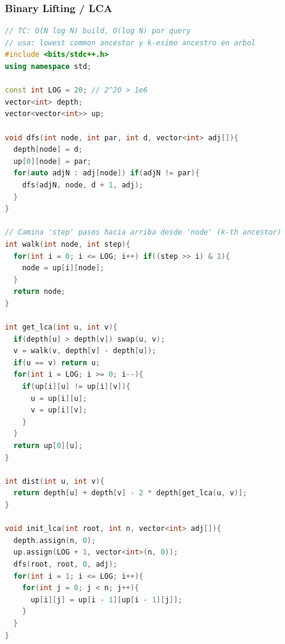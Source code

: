 \subsubsection{Binary Lifting / LCA}
\begin{lstlisting}[style=mystyle, language=C++]
// TC: O(N log N) build, O(log N) por query
// usa: lowest common ancestor y k-esimo ancestro en arbol
#include <bits/stdc++.h>
using namespace std;

const int LOG = 20; // 2^20 > 1e6
vector<int> depth;
vector<vector<int>> up;

void dfs(int node, int par, int d, vector<int> adj[]){
  depth[node] = d;
  up[0][node] = par;
  for(auto adjN : adj[node]) if(adjN != par){
    dfs(adjN, node, d + 1, adj);
  }
}

// Camina 'step' pasos hacia arriba desde 'node' (k-th ancestor)
int walk(int node, int step){
  for(int i = 0; i <= LOG; i++) if((step >> i) & 1){
    node = up[i][node];
  }
  return node;
}

int get_lca(int u, int v){
  if(depth[u] > depth[v]) swap(u, v);
  v = walk(v, depth[v] - depth[u]);
  if(u == v) return u;
  for(int i = LOG; i >= 0; i--){
    if(up[i][u] != up[i][v]){
      u = up[i][u];
      v = up[i][v];
    }
  }
  return up[0][u];
}

int dist(int u, int v){
  return depth[u] + depth[v] - 2 * depth[get_lca(u, v)];
}

void init_lca(int root, int n, vector<int> adj[]){
  depth.assign(n, 0);
  up.assign(LOG + 1, vector<int>(n, 0));
  dfs(root, root, 0, adj);
  for(int i = 1; i <= LOG; i++){
    for(int j = 0; j < n; j++){
      up[i][j] = up[i - 1][up[i - 1][j]];
    }
  }
}
\end{lstlisting}
